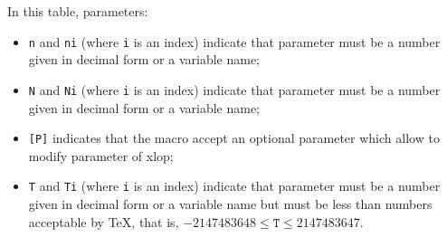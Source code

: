 \documentclass[12pt]{report}
\newcommand\package[1]{\textsf{#1}}
\begin{document}
In this table, parameters:
\begin{itemize}
\item \texttt{n} and \texttt{ni} (where \texttt{i} is an index)
  indicate that parameter must be a number given in decimal form or a
  variable name;
\item \texttt{N} and \texttt{Ni} (where \texttt{i} is an index)
  indicate that parameter must be a number given in decimal form or a
  variable name;
\item \texttt{[P]} indicates that the macro accept an optional
  parameter which allow to modify parameter of \package{xlop};
\item \texttt{T} and \texttt{Ti} (where \texttt{i} is an index)
  indicate that parameter must be a number given in decimal form or a
  variable name but must be less than numbers acceptable by \TeX{},
  that is, $-2147483648 \le \mathtt{T} \le 2147483647$.
\end{itemize}
\end{document}

